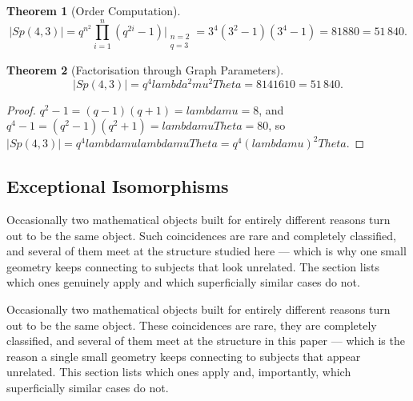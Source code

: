 \documentclass[12pt,a4paper]{article}
\def\mathrm#1{#1}%
\def\lambda{lambda}%
\def\mu{mu}%
\def\Theta{Theta}%
\def\cdot{ }%
\newtheorem{theorem}{Theorem}[section]
\theoremstyle{definition}
\newcommand{\Sp}{\mathrm{Sp}}
\begin{document}
\begin{theorem}[Order Computation]
\begin{equation}
|\Sp(4,3)| = q^{n^2}\prod_{i=1}^{n}(q^{2i}-1)\bigg|_{\substack{n=2\\q=3}}
= 3^4\cdot(3^2-1)(3^4-1) = 81\cdot 8\cdot 80 = 51\,840.
\label{eq:sp-order}
\end{equation}
\end{theorem}

\begin{theorem}[Factorisation through Graph Parameters]
\label{thm:sp-factor}
\begin{equation}
|\Sp(4,3)| = q^4\cdot\lambda^2\cdot\mu^2\cdot\Theta
= 81\cdot 4\cdot 16\cdot 10 = 51\,840.
\end{equation}
\end{theorem}

\begin{proof}
$q^2-1 = (q-1)(q+1) = \lambda\mu = 8$, and
$q^4-1 = (q^2-1)(q^2+1) = \lambda\mu\Theta = 80$, so
$|\Sp(4,3)| = q^4\cdot\lambda\mu\cdot\lambda\mu\Theta
= q^4(\lambda\mu)^2\Theta$. \qedhere
\end{proof}

\subsection{Exceptional Isomorphisms}

\begin{plainbox}
Occasionally two mathematical objects built for entirely different reasons turn out
to be the same object. Such coincidences are rare and completely classified, and several of
them meet at the structure studied here --- which is why one small geometry keeps connecting
to subjects that look unrelated. The section lists which ones genuinely apply and which
superficially similar cases do not.
\end{plainbox}


\begin{plainbox}
Occasionally two mathematical objects built for entirely different reasons turn out
to be the same object. These coincidences are rare, they are completely classified, and
several of them meet at the structure in this paper --- which is the reason a single small
geometry keeps connecting to subjects that appear unrelated. This section lists which ones
apply and, importantly, which superficially similar cases do not.
\end{plainbox}
\end{document}
